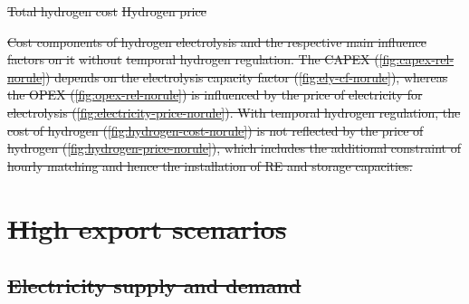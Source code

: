\documentclass[5p,numafflabel]{elsarticle}
\def\runsensnogreenhy{decr_14_3H_ws}
\providecommand{\DIFdeltex}[1]{{\protect\color{red}\sout{#1}}}                      %
\providecommand{\DIFdelFL}[1]{\DIFdel{#1}} %
\providecommand{\DIFdel}[1]{\texorpdfstring{\DIFdeltex{#1}}{}} %
\begin{document}
{%
\DIFdelFL{Total hydrogen cost}}
{%
\DIFdelFL{Hydrogen price}}

{%
\DIFdelFL{Cost components of hydrogen electrolysis and the respective main influence factors on it }%
\DIFdelFL{without}%
\DIFdelFL{temporal hydrogen regulation. The CAPEX (\ref{fig:capex-rel-norule}) depends on the electrolysis capacity factor (\ref{fig:ely-cf-norule}), whereas the OPEX (\ref{fig:opex-rel-norule}) is influenced by the price of electricity for electrolysis (\ref{fig:electricity-price-norule}). With temporal hydrogen regulation, the cost of hydrogen  (\ref{fig:hydrogen-cost-norule}) is not reflected by the price of hydrogen (\ref{fig:hydrogen-price-norule}), which includes the additional constraint of hourly matching and hence the installation of RE and storage capacities.}}


\section{\DIFdel{High export scenarios}}
\addtocounter{section}{-1}%
\subsection{\DIFdel{Electricity supply and demand}}
\addtocounter{subsection}{-1}%
\end{document}
